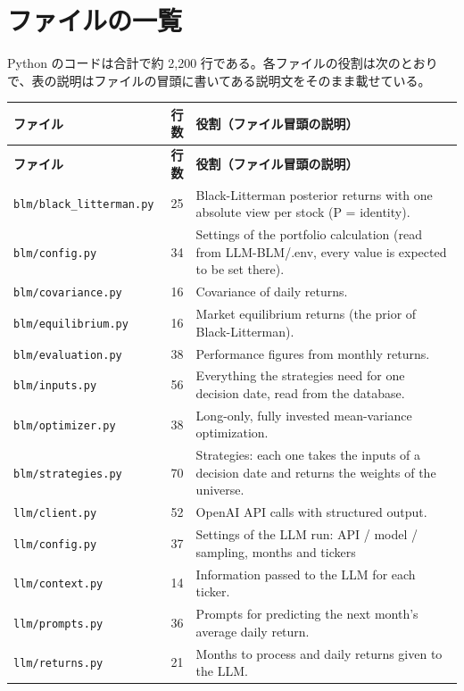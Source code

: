 \documentclass[xelatex,ja=standard,jafont=hiragino-pron,a4paper,10pt]{bxjsreport}
\begin{document}
\section{ファイルの一覧}

Python のコードは合計で約 2,200 行である。各ファイルの役割は次のとおりで、表の説明はファイルの冒頭に書いてある説明文をそのまま載せている。

{\footnotesize
\begin{longtable}{p{5.20cm}rp{8.20cm}}
\toprule
\textbf{ファイル} & \textbf{行数} & \textbf{役割（ファイル冒頭の説明）} \\
\midrule
\endfirsthead
\toprule
\textbf{ファイル} & \textbf{行数} & \textbf{役割（ファイル冒頭の説明）} \\
\midrule
\endhead
\bottomrule
\endfoot
\texttt{blm/black\_\allowbreak{}litterman.py} & 25 & Black-Litterman posterior returns with one absolute view per stock (P = identity). \\
\texttt{blm/config.py} & 34 & Settings of the portfolio calculation (read from LLM-BLM/.env, every value is expected to be set there). \\
\texttt{blm/covariance.py} & 16 & Covariance of daily returns. \\
\texttt{blm/equilibrium.py} & 16 & Market equilibrium returns (the prior of Black-Litterman). \\
\texttt{blm/evaluation.py} & 38 & Performance figures from monthly returns. \\
\texttt{blm/inputs.py} & 56 & Everything the strategies need for one decision date, read from the database. \\
\texttt{blm/optimizer.py} & 38 & Long-only, fully invested mean-variance optimization. \\
\texttt{blm/strategies.py} & 70 & Strategies: each one takes the inputs of a decision date and returns the weights of the universe. \\
\texttt{llm/client.py} & 52 & OpenAI API calls with structured output. \\
\texttt{llm/config.py} & 37 & Settings of the LLM run: API / model / sampling, months and tickers \\
\texttt{llm/context.py} & 14 & Information passed to the LLM for each ticker. \\
\texttt{llm/prompts.py} & 36 & Prompts for predicting the next month's average daily return. \\
\texttt{llm/returns.py} & 21 & Months to process and daily returns given to the LLM. \\

\end{longtable}}
\end{document}

